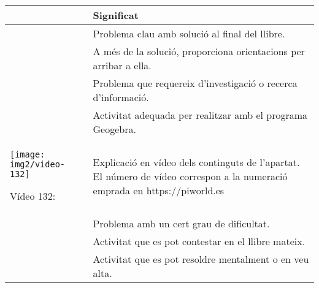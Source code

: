 \begin{center}
	\renewcommand{\arraystretch}{1.5}
\begin{longtable}[h]{>{\raggedleft\arraybackslash}p{}|p{}}
	{\bfseries Símbol} & {\bfseries Significat} \\ \hline
	
	\simbolclau & Problema clau amb solució al final del llibre.  \\ \hline
	
	\simbolcompass & A més de la solució, proporciona orientacions per arribar a ella.  \\ \hline
	
	\simbolsearch & Problema que requereix d'investigació o recerca d'informació.  \\ \hline

	\ggb & Activitat adequada per realitzar amb el programa Geogebra.  \\ \hline
		
	\begin{center}\texttt{[image: img2/video-132]}\par {\footnotesize Vídeo 132:}\end{center} & Explicació en vídeo dels continguts de l'apartat. El número de vídeo correspon a la numeració emprada en https://piworld.es 
	
	\\ \hline
	\hot[2] & Problema amb un cert grau de dificultat. \\ [0.25cm] \hline
	\spen & Activitat que es pot contestar en el llibre mateix. \\ [0.25cm] \hline 
	\mental & Activitat que es pot resoldre mentalment o en veu alta.
\end{longtable}
\end{center}
\vspace{1cm} 
 

